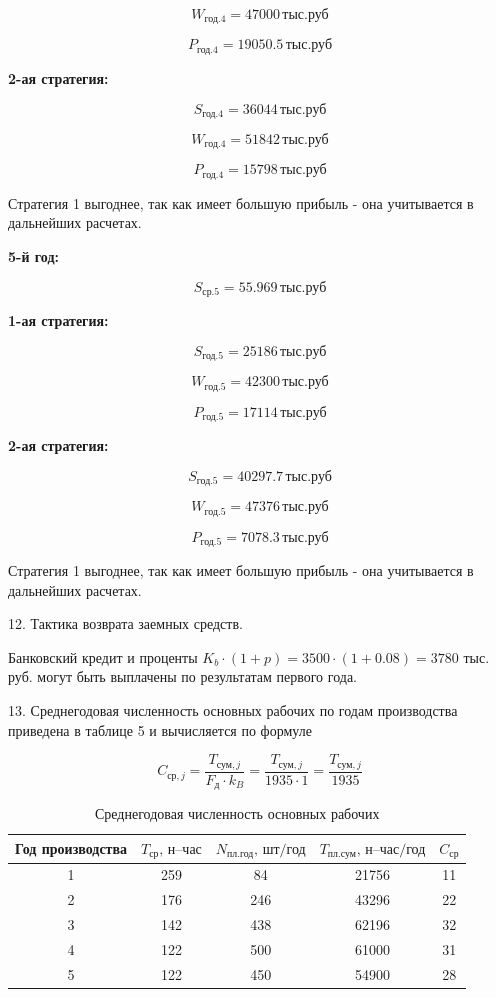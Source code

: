 \[
    W_{\text{год.4}} = 47000 \, \text{тыс.руб}
\]

\[
    P_{\text{год.4}} = 19050.5 \, \text{тыс.руб}
\]

\textbf{2-ая стратегия:}

\[
    S_{\text{год.4}} = 36044 \, \text{тыс.руб}
\]

\[
    W_{\text{год.4}} = 51842 \, \text{тыс.руб}
\]

\[
    P_{\text{год.4}} = 15798 \, \text{тыс.руб}
\]

Стратегия 1 выгоднее, так как имеет большую прибыль - она учитывается в
дальнейших расчетах.

\textbf{5-й год:}

\[
    S_{\text{ср.5}} = 55.969 \,  \text{тыс.руб}
\]

\textbf{1-ая стратегия:}

\[
    S_{\text{год.5}} = 25186 \, \text{тыс.руб}
\]

\[
    W_{\text{год.5}} = 42300 \, \text{тыс.руб}
\]

\[
    P_{\text{год.5}} = 17114 \, \text{тыс.руб}
\]

\textbf{2-ая стратегия:}

\[
    S_{\text{год.5}} = 40297.7 \, \text{тыс.руб}
\]

\[
    W_{\text{год.5}} = 47376 \, \text{тыс.руб}
\]

\[
    P_{\text{год.5}} = 7078.3 \, \text{тыс.руб}
\]

Стратегия 1 выгоднее, так как имеет большую прибыль - она учитывается в
дальнейших расчетах.

12. Тактика возврата заемных средств.

Банковский  кредит и проценты $K_b \cdot (1 + p) = 3500 \cdot (1 + 0.08) = 3780$
тыс. руб. могут быть выплачены по результатам первого года.

13. Среднегодовая численность основных рабочих по годам производства
приведена в таблице 5 и вычисляется по формуле

\[
C_{\text{ср},j} = \frac{T_{\text{сум},j}}{F_{\text{д}} \cdot k_B} = \frac{T_{\text{сум},j}}{1935 \cdot 1} = \frac{T_{\text{сум},j}}{1935}
\]

\begin{table}
\caption{Среднегодовая численность основных рабочих}
\begin{tabular}{|c|c|c|c|c|} \hline
Год производства & $T_{\text{ср}}, \, \text{н--час}$ & $N_{\text{пл.год}}, \, \text{шт/год}$ & $T_{\text{пл.сум}}, \, \text{н--час/год}$ & $C_{\text{ср}}$ \\ \hline
1 & 259 & 84  & 21756 & 11 \\ \hline
2 & 176 & 246 & 43296 & 22 \\ \hline
3 & 142 & 438 & 62196 & 32 \\ \hline
4 & 122 & 500 & 61000 & 31 \\ \hline
5 & 122 & 450 & 54900 & 28 \\ \hline
\end{tabular}
\end{table}

